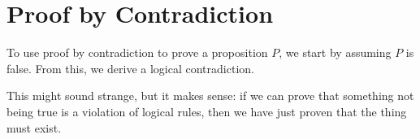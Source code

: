%
%
%
%
%
%
%
%
%
%
\section{Proof by Contradiction}

To use proof by contradiction to prove a proposition $P$,
we start by assuming $P$ is false.
From this, we derive a logical contradiction.

This might sound strange, but it makes sense: if we can prove that something not
being true is a violation of logical rules, then we have just proven that the
thing must exist.

